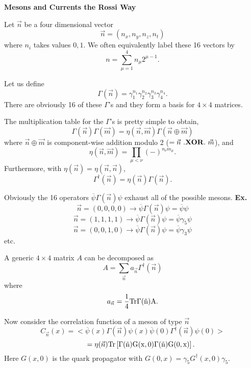% 
%
%
\def\Tr{\rm Tr}
\def\trd{\rm tr_d}
\def\trc{\rm tr_c}
\def\Re{\rm Re}

\centerline{\bf Mesons and Currents the Rossi Way}
\bigskip

\medskip

Let $\vec n$ be a four dimensional vector
$$ \vec n = (n_x, n_y, n_z, n_t) $$
where $n_i $ takes values $0, 1.$ We often equivalently label these 16
vectors by 
$$ n = \sum_{\mu = 1}^4 n_{\mu} 2^{\mu-1}. $$

Let us define 
$$\Gamma(\vec n) = \gamma_1^{n_1}\gamma_2^{n_2}\gamma_3^{n_3}\gamma_4^{n_4}.$$
There are obviously 16 of these $\Gamma$'s and they form a basis for
$ 4 \times 4 $ matrices.

The multiplication table for the $\Gamma$'s is pretty simple to obtain,
$$ \Gamma(\vec n)\Gamma(\vec m) = 
   \eta(\vec n,\vec m)\Gamma(\vec n \oplus \vec m)$$
where $\vec n \oplus \vec m$ is component-wise addition modulo 2 ($ = \vec n 
~.{\bf XOR}.~ \vec m$), and 
$$ \eta(\vec n, \vec m) = \prod_{\mu < \nu}(-)^{n_\nu m_\mu}. $$
Furthermore, with $\eta(\vec n) = \eta(\vec n,\vec n)$,
$$ \Gamma^\dagger(\vec n) = \eta(\vec n) \Gamma(\vec n). $$

Obviously the 16 operators $\overline \psi \Gamma(\vec n)\psi $
exhaust all of the possible mesons.
\smallskip
{\bf Ex.}
$$\vec n = (0, 0, 0, 0) \to 
 \overline \psi \Gamma(\vec n) \psi = \overline \psi \psi$$
$$\vec n = (1, 1, 1, 1) \to 
 \overline \psi \Gamma(\vec n) \psi = \overline \psi \gamma_5 \psi$$
$$\vec n = (0, 0, 1, 0) \to 
 \overline \psi \Gamma(\vec n) \psi = \overline \psi \gamma_3 \psi$$
etc.

A generic $4 \times 4$ matrix $A$ can be decomposed as
$$ A = \sum_{\vec n} a_{\vec n}\Gamma^\dagger(\vec n) $$
where 
$$ a_{\vec n} = {1 \over 4} \Tr \Gamma(\vec n)A. $$

Now consider the correlation function of a meson of type $\vec n$
$$ C_{\vec n} (x) = < \overline \psi(x) \Gamma(\vec n) \psi(x)
 \overline \psi(0) \Gamma^\dagger(\vec n) \psi(0)> $$
$$ ~~~~~~~ =\eta(\vec n) \Tr \left[ \Gamma(\vec n) G(x,0) 
 \Gamma(\vec n) G(0,x) \right]. $$
Here $G(x,0)$ is the quark propagator with $G(0,x) = \gamma_5 
G^\dagger (x,0) \gamma_5$.

